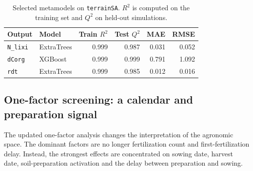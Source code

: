 \documentclass[11pt,a4paper]{article}
\newcommand{\param}[1]{\texttt{#1}}
\begin{document}
\begin{table}[!tbp]
\centering
\caption{Selected metamodels on \texttt{terrainSA}. $R^2$ is computed on the training set and $Q^2$ on held-out simulations.}
\label{tab:metamodel}
\begin{tabular}{llrrrr}
\toprule
Output & Model & Train $R^2$ & Test $Q^2$ & MAE & RMSE \\
\midrule
\param{N\_lixi} & ExtraTrees & 0.999 & 0.987 & 0.031 & 0.052 \\
\param{dCorg} & XGBoost & 0.999 & 0.999 & 0.791 & 1.092 \\
\param{rdt} & ExtraTrees & 0.999 & 0.985 & 0.012 & 0.016 \\
\bottomrule
\end{tabular}
\end{table}

\subsection{One-factor screening: a calendar and preparation signal}

The updated one-factor analysis changes the interpretation of the agronomic space. The dominant factors are no longer fertilization count and first-fertilization delay. Instead, the strongest effects are concentrated on sowing date, harvest date, soil-preparation activation and the delay between preparation and sowing.
\end{document}
